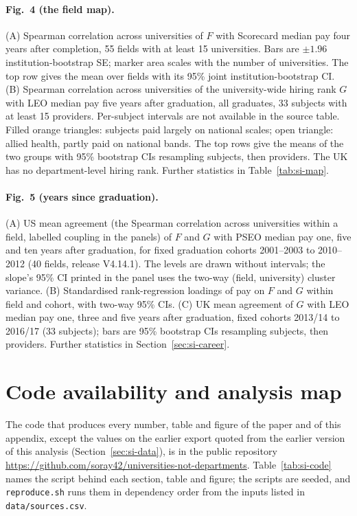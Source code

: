 \documentclass[11pt]{article}
\begin{document}
\paragraph{Fig.~4 (the field map).} (A) Spearman correlation across universities of $F$ with Scorecard median pay
four years after completion, 55 fields with at least 15 universities. Bars are $\pm1.96$ institution-bootstrap SE;
marker area scales with the number of universities. The top row gives the mean over fields with its 95\% joint
institution-bootstrap CI. (B) Spearman correlation across universities of the university-wide hiring rank $G$ with
LEO median pay five years after graduation, all graduates, 33 subjects with at least 15 providers. Per-subject
intervals are not available in the source table. Filled orange triangles: subjects paid largely on national scales;
open triangle: allied health, partly paid on national bands. The top rows give the means of the two groups with 95\%
bootstrap CIs resampling subjects, then providers. The UK has no department-level hiring rank. Further statistics in
Table~\ref{tab:si-map}.

\paragraph{Fig.~5 (years since graduation).} (A) US mean agreement (the Spearman correlation across universities
within a field, labelled coupling in the panels) of $F$ and $G$ with PSEO median pay one, five and ten years after
graduation, for fixed graduation cohorts 2001--2003 to 2010--2012 (40 fields, release V4.14.1). The levels are drawn
without intervals; the slope's 95\% CI printed in the panel uses the two-way (field, university) cluster variance.
(B) Standardised rank-regression loadings of pay on $F$ and $G$ within field and cohort, with two-way 95\% CIs.
(C) UK mean agreement of $G$ with LEO median pay one, three and five years after graduation, fixed cohorts 2013/14 to
2016/17 (33 subjects); bars are 95\% bootstrap CIs resampling subjects, then providers. Further statistics in
Section~\ref{sec:si-career}.

\section{Code availability and analysis map}\label{sec:si-code}

The code that produces every number, table and figure of the paper and of this appendix, except the values on the
earlier export quoted from the earlier version of this analysis (Section~\ref{sec:si-data}), is in the public
repository \url{https://github.com/soray42/universities-not-departments}. Table~\ref{tab:si-code} names the script
behind each section, table and figure; the scripts are seeded, and \nolinkurl{reproduce.sh} runs them in dependency
order from the inputs listed in \nolinkurl{data/sources.csv}.
\end{document}
